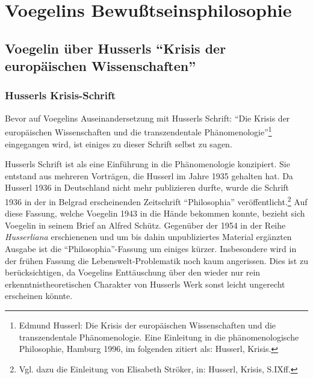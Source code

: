 

\chapter{Voegelins Bewußtseinsphilosophie}


\section{Voegelin über Husserls "`Krisis der europäischen
  Wissenschaften"'}

\subsection{Husserls Krisis-Schrift}

Bevor auf Voegelins Auseinandersetzung mit Husserls Schrift: "`Die Krisis der
europäischen Wissenschaften und die transzendentale
Phänomenologie"'\footnote{Edmund Husserl: Die Krisis der europäischen
  Wissenschaften und die transzendentale Phänomenologie. Eine Einleitung in
  die phänomenologische Philosophie, Hamburg 1996, im folgenden zitiert als:
  Husserl, Krisis.} eingegangen wird, ist einiges zu dieser Schrift selbst zu
sagen.

Husserls Schrift ist als eine Einführung in die Phänomenologie konzipiert. Sie
entstand aus mehreren Vorträgen, die Husserl im Jahre 1935 gehalten hat. Da
Husserl 1936 in Deutschland nicht mehr publizieren durfte, wurde die Schrift
1936 in der in Belgrad erscheinenden Zeitschrift "`Philosophia"'
veröffentlicht.\footnote{Vgl. dazu die Einleitung von Elisabeth Ströker, in:
  Husserl, Krisis, S.IXff.} Auf diese Fassung, welche Voegelin 1943 in die
Hände bekommen konnte, bezieht sich Voegelin in seinem Brief an Alfred Schütz.
Gegenüber der 1954 in der Reihe {\it Husserliana} erschienenen und um bis
dahin unpubliziertes Material ergänzten Ausgabe ist die
"`Philosophia"'-Fassung um einiges kürzer. Insbesondere wird in der frühen
Fassung die Lebenswelt-Problematik noch kaum angerissen. Dies ist zu
berücksichtigen, da Voegelins Enttäuschung über den wieder nur rein
erkenntnistheoretischen Charakter von Husserls Werk sonst leicht ungerecht
erscheinen könnte.

